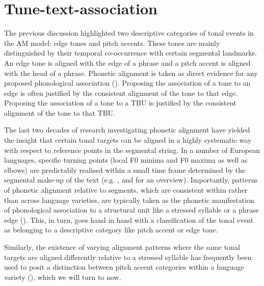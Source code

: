 \section{Tune-text-association}\label{sec:2.4}
The previous discussion highlighted two descriptive categories of tonal events in the AM model: edge tones and pitch accents. These tones are mainly distinguished by their temporal co-occurrence with certain segmental landmarks. An edge tone is aligned with the edge of a phrase and a pitch accent is aligned with the head of a phrase. Phonetic alignment is taken as direct evidence for any proposed phonological association (\citealt{Arvaniti.etal2000}). Proposing the association of a tone to an edge is often justified by the consistent alignment of the tone to that edge. Proposing the association of a tone to a TBU is justified by the consistent alignment of the tone to that TBU.

The last two decades of research investigating phonetic alignment have yielded the insight that certain tonal targets can be aligned in a highly systematic way with respect to reference points in the segmental string. In a number of European languages, specific turning points (local F0 minima and F0 maxima as well as elbows) are predictably realised within a small time frame determined by the segmental make-up of the text (e.g. \citealt{Arvaniti.etal1998,AttererLadd2004,ArvanitiLadd2009,Muecke.etal2009}, and \citealt{Ladd2008} for an overview). Importantly, patterns of phonetic alignment relative to segments, which are consistent within rather than across language varieties, are typically taken as the phonetic manifestation of phonological association to a structural unit like a stressed syllable or a phrase edge (\citealt{Arvaniti.etal2000}). This, in turn, goes hand in hand with a classification of the tonal event as belonging to a descriptive category like pitch accent or edge tone.

Similarly, the existence of varying alignment patterns where the same tonal targets are aligned differently relative to a stressed syllable has frequently been used to posit a distinction between pitch accent categories within a language variety (\citealt{PierrSteele1989,DimperioHouse1997,FacePrieto2007}), which we will turn to now.


